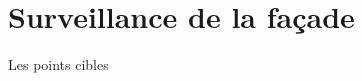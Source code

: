 \documentclass[french]{article}
\begin{document}
\section{Surveillance de la façade}
Les points cibles
\end{document}
